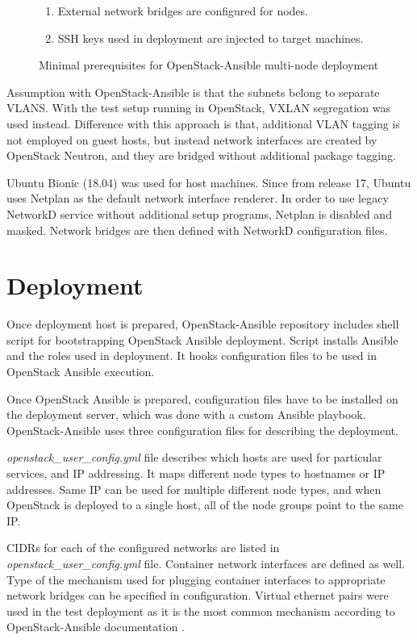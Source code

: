 \begin{figure}[!b]
\centering
\begin{enumerate}
  \itemsep0em
  \item External network bridges are configured for nodes.
  \item SSH keys used in deployment are injected to target machines.
\end{enumerate}
\caption{Minimal prerequisites for OpenStack-Ansible multi-node deployment}
\label{fig:osa-requirements}
\end{figure}

Assumption with OpenStack-Ansible is that the subnets belong to separate VLANS.
With the test setup running in OpenStack, VXLAN segregation was used instead.
Difference with this approach is that, additional VLAN tagging is not employed
on guest hosts, but instead network interfaces are created by OpenStack
Neutron, and they are bridged without additional package tagging.

Ubuntu Bionic (18.04) was used for host machines. Since from release 17, Ubuntu
uses Netplan \cite{netplan} as the default network interface renderer. In order
to use legacy NetworkD service without additional setup programs, Netplan is
disabled and masked. Network bridges are then defined with NetworkD
configuration files.

\section{Deployment}

Once deployment host is prepared, OpenStack-Ansible repository includes shell
script for bootstrapping OpenStack Ansible deployment. Script installs Ansible
and the roles used in deployment. It hooks configuration files to be used in
OpenStack Ansible execution.

Once OpenStack Ansible is prepared, configuration files have to be installed on
the deployment server, which was done with a custom Ansible playbook.
OpenStack-Ansible uses three configuration files for describing the deployment.

\textit{openstack\_user\_config.yml} file describes which hosts are used for
particular services, and IP addressing. It maps different node types to
hostnames or IP addresses. Same IP can be used for multiple different node
types, and when OpenStack is deployed to a single host, all of the node groups
point to the same IP.

CIDRs for each of the configured networks are listed in
\textit{openstack\_user\_config.yml} file. Container network interfaces are
defined as well. Type of the mechanism used for plugging container interfaces
to appropriate network bridges can be specified in configuration. Virtual
ethernet pairs were used in the test deployment as it is the most common
mechanism according to OpenStack-Ansible documentation
\cite{openstack-ansible}.


